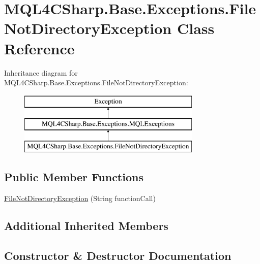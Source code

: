 \hypertarget{class_m_q_l4_c_sharp_1_1_base_1_1_exceptions_1_1_file_not_directory_exception}{}\section{M\+Q\+L4\+C\+Sharp.\+Base.\+Exceptions.\+File\+Not\+Directory\+Exception Class Reference}
\label{class_m_q_l4_c_sharp_1_1_base_1_1_exceptions_1_1_file_not_directory_exception}
Inheritance diagram for M\+Q\+L4\+C\+Sharp.\+Base.\+Exceptions.\+File\+Not\+Directory\+Exception\+:\begin{figure}[H]
\begin{center}
\leavevmode
\includegraphics[height=3.000000cm]{class_m_q_l4_c_sharp_1_1_base_1_1_exceptions_1_1_file_not_directory_exception}
\end{center}
\end{figure}
\subsection*{Public Member Functions}
\begin{DoxyCompactItemize}
\item 
\hyperlink{class_m_q_l4_c_sharp_1_1_base_1_1_exceptions_1_1_file_not_directory_exception_a2b5eed5c6b9874149f60244a69d52e8a}{File\+Not\+Directory\+Exception} (String function\+Call)
\end{DoxyCompactItemize}
\subsection*{Additional Inherited Members}


\subsection{Constructor \& Destructor Documentation}
